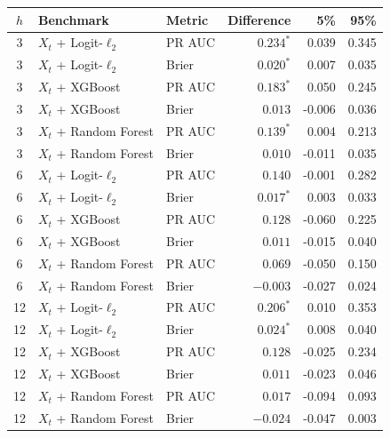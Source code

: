 \begin{tabular}{c l l r r r}
\toprule
$h$ & Benchmark & Metric & Difference & 5\% & 95\% \\
\midrule
3 & $X_t$ + Logit-$\ell_2$ & PR AUC & $0.234^{*}$ & 0.039 & 0.345 \\
3 & $X_t$ + Logit-$\ell_2$ & Brier & $0.020^{*}$ & 0.007 & 0.035 \\
3 & $X_t$ + XGBoost & PR AUC & $0.183^{*}$ & 0.050 & 0.245 \\
3 & $X_t$ + XGBoost & Brier & $0.013$ & -0.006 & 0.036 \\
3 & $X_t$ + Random Forest & PR AUC & $0.139^{*}$ & 0.004 & 0.213 \\
3 & $X_t$ + Random Forest & Brier & $0.010$ & -0.011 & 0.035 \\
\midrule
6 & $X_t$ + Logit-$\ell_2$ & PR AUC & $0.140$ & -0.001 & 0.282 \\
6 & $X_t$ + Logit-$\ell_2$ & Brier & $0.017^{*}$ & 0.003 & 0.033 \\
6 & $X_t$ + XGBoost & PR AUC & $0.128$ & -0.060 & 0.225 \\
6 & $X_t$ + XGBoost & Brier & $0.011$ & -0.015 & 0.040 \\
6 & $X_t$ + Random Forest & PR AUC & $0.069$ & -0.050 & 0.150 \\
6 & $X_t$ + Random Forest & Brier & $-0.003$ & -0.027 & 0.024 \\
\midrule
12 & $X_t$ + Logit-$\ell_2$ & PR AUC & $0.206^{*}$ & 0.010 & 0.353 \\
12 & $X_t$ + Logit-$\ell_2$ & Brier & $0.024^{*}$ & 0.008 & 0.040 \\
12 & $X_t$ + XGBoost & PR AUC & $0.128$ & -0.025 & 0.234 \\
12 & $X_t$ + XGBoost & Brier & $0.011$ & -0.023 & 0.046 \\
12 & $X_t$ + Random Forest & PR AUC & $0.017$ & -0.094 & 0.093 \\
12 & $X_t$ + Random Forest & Brier & $-0.024$ & -0.047 & 0.003 \\
\bottomrule
\end{tabular}
